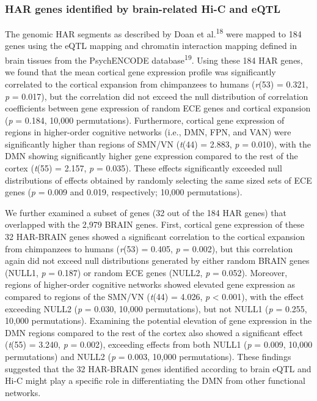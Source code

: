 \begin{refsection}
\subsubsection{HAR genes identified by brain-related Hi-C and eQTL}
The genomic HAR segments as described by Doan et al.\textsuperscript{18} were mapped to 184 genes using the eQTL mapping and chromatin interaction mapping defined in brain tissues from the PsychENCODE database\textsuperscript{19}. Using these 184 HAR genes, we found that the mean cortical gene expression profile was significantly correlated to the cortical expansion from chimpanzees to humans (\textit{r}(53) = 0.321, \textit{p} = 0.017), but the correlation did not exceed the null distribution of correlation coefficients between gene expression of random ECE genes and cortical expansion (\textit{p} = 0.184, 10,000 permutations). Furthermore, cortical gene expression of regions in higher-order cognitive networks (i.e., DMN, FPN, and VAN) were significantly higher than regions of SMN/VN (\textit{t}(44) = 2.883, \textit{p} = 0.010), with the DMN showing significantly higher gene expression compared to the rest of the cortex (\textit{t}(55) = 2.157, \textit{p} = 0.035). These effects significantly exceeded null distributions of effects obtained by randomly selecting the same sized sets of ECE genes (\textit{p} = 0.009 and 0.019, respectively; 10,000 permutations).

We further examined a subset of genes (32 out of the 184 HAR genes) that overlapped with the 2,979 BRAIN genes. First, cortical gene expression of these 32 HAR-BRAIN genes showed a significant correlation to the cortical expansion from chimpanzees to humans (\textit{r}(53) = 0.405, \textit{p} = 0.002), but this correlation again did not exceed null distributions generated by either random BRAIN genes (NULL1, \textit{p} = 0.187) or random ECE genes (NULL2, \textit{p} = 0.052). Moreover, regions of higher-order cognitive networks showed elevated gene expression as compared to regions of the SMN/VN (\textit{t}(44) = 4.026, \textit{p} < 0.001), with the effect exceeding NULL2 (\textit{p} = 0.030, 10,000 permutations), but not NULL1 (\textit{p} = 0.255, 10,000 permutations). Examining the potential elevation of gene expression in the DMN regions compared to the rest of the cortex also showed a significant effect (\textit{t}(55) = 3.240, \textit{p} = 0.002), exceeding effects from both NULL1 (\textit{p} = 0.009, 10,000 permutations) and NULL2 (\textit{p} = 0.003, 10,000 permutations). These findings suggested that the 32 HAR-BRAIN genes identified according to brain eQTL and Hi-C might play a specific role in differentiating the DMN from other functional networks.


\end{refsection}
